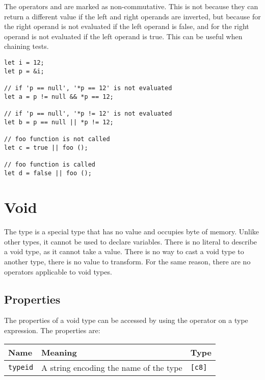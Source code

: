\begin{itemize}
  The operators \token{\&\&} and \token{||} are marked as non-commutative. This
  is not because they can return a different value if the left and right operands
  are inverted, but because for \token{\&\&} the right operand is not evaluated
  if the left operand is false, and for \token{||} the right operand is not
  evaluated if the left operand is true. This can be useful when chaining tests.

  \begin{lstlisting}[style=coloredverbatim]
let i = 12;
let p = &i;

// if 'p == null', '*p == 12' is not evaluated
let a = p != null && *p == 12;

// if 'p == null', '*p != 12' is not evaluated
let b = p == null || *p != 12;

// foo function is not called
let c = true || foo ();

// foo function is called
let d = false || foo ();
  \end{lstlisting}
\end{itemize}

\section{Void}
\label{sec:org409c2d8}

The  type is a special type that has no value and occupies
 byte of memory. Unlike other types, it cannot be used to declare
variables. There is no literal to describe a void type, as it cannot take a
value. There is no way to cast a void type to another type, there is no value to
transform. For the same reason, there are no operators applicable to void types.

\vspace{-10pt}
\subsection{Properties}
\label{sec:orgffa98ee}

The properties of a void type can be accessed by using the \token{::} operator
on a type expression. The properties are:

\begin{center}
  \vspace{-5pt}
  \begin{adjustbox}{max width=\linewidth}
    \begin{tabular}{|l|ll|}
      \hline
      Name & Meaning & Type\\[0pt]
      \hline
      \hline
      \texttt{typeid} & A string encoding the name of the type & \texttt{[c8]}\\[0pt]
      \hline
    \end{tabular}
  \end{adjustbox}
\end{center}
